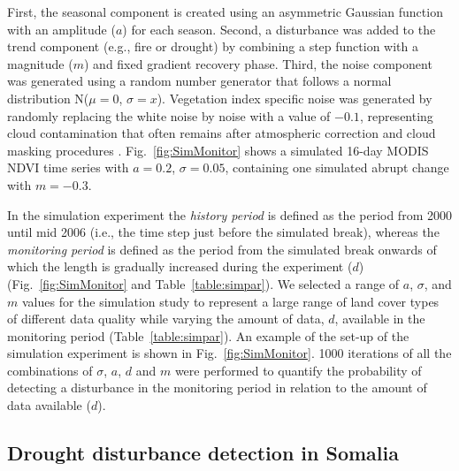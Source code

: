 \documentclass[authoryear,preprint,review,10pt]{elsarticle}
\begin{document}
First, the seasonal component is created using an asymmetric Gaussian function with an amplitude ($a$) for each season. Second, a disturbance was added to the trend component (e.g., fire or drought) by combining a step function with a magnitude ($m$) and fixed gradient recovery phase. Third, the noise component was generated using a random number generator that follows a normal distribution N($\mu = 0$, $\sigma =x$). Vegetation index specific noise was generated by randomly replacing the white noise by noise with a value of $-0.1$, representing cloud contamination that often remains after atmospheric correction and cloud masking procedures \citep[see][for more details]{Verbesselt:2010wo}. Fig.~\ref{fig:SimMonitor} shows a simulated 16-day MODIS NDVI time series with $a = 0.2$, $\sigma = 0.05$, containing one simulated abrupt change with $m = -0.3$.

In the simulation experiment the \emph{history period} is defined as the period from 2000 until mid 2006 (i.e., the time step just before the simulated break), whereas the \emph{monitoring period} is defined as the period from the simulated break onwards of which the length is gradually increased during the experiment ($d$) (Fig.~\ref{fig:SimMonitor} and Table~\ref{table:simpar}). We selected a range of $a$, $\sigma$, and $m$ values for the simulation study to represent a large range of land cover types of different data quality while varying the amount of data, $d$, available in the monitoring period (Table~\ref{table:simpar}). An example of the set-up of the simulation experiment is shown in Fig.~\ref{fig:SimMonitor}. 1000 iterations of all the combinations of $\sigma$, $a$, $d$ and $m$ were performed to quantify the probability of detecting a disturbance in the monitoring period in relation to the amount of data available ($d$).

\subsection{Drought disturbance detection in Somalia}\label{sec:RealData}
\end{document}
